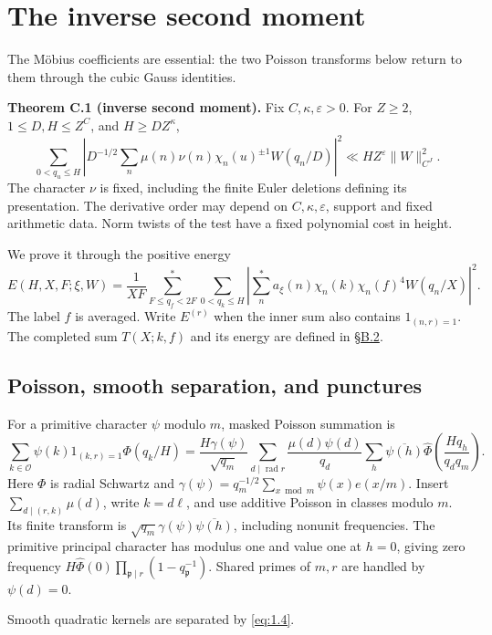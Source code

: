 \documentclass[11pt,a4paper]{article}
\begin{document}
\section{The inverse second moment}\label{sec:C}

The Möbius coefficients are essential: the two Poisson transforms below return to them through the cubic Gauss identities.

\textbf{Theorem C.1 (inverse second moment).} Fix \(C,\kappa,\varepsilon>0\). For \(Z\ge2\), \(1\le D,H\le Z^C\), and \(H\ge DZ^\kappa\), \[
\sum_{0<q_u\le H}\left|D^{-1/2}
\sum_n\mu(n)\nu(n)\chi_n(u)^{\pm1}W(q_n/D)\right|^2
\ll HZ^\varepsilon\|W\|_{C^J}^2.
\tag{C.1}\label{eq:C.1}
\] The character \(\nu\) is fixed, including the finite Euler deletions defining its presentation. The derivative order may depend on \(C,\kappa,\varepsilon\), support and fixed arithmetic data. Norm twists of the test have a fixed polynomial cost in height.

We prove it through the positive energy \[
E(H,X,F;\xi,W)=\frac1{XF}
\sum_{F\le q_f<2F}^{*}\sum_{0<q_k\le H}
\left|\sum_n^{*}a_\xi(n)\chi_n(k)\chi_n(f)^4W(q_n/X)\right|^2.
\tag{C.2}\label{eq:C.2}
\] The label \(f\) is averaged. Write \(E^{(r)}\) when the inner sum also contains \(1_{(n,r)=1}\). The completed sum \(T(X;k,f)\) and its energy are defined in \hyperref[sec:B.2]{§B.2}.

\subsection{Poisson, smooth separation, and punctures}\label{sec:C.1}

For a primitive character \(\psi\) modulo \(m\), masked Poisson summation is \[
\sum_{k\in\mathcal O}\psi(k)1_{(k,r)=1}\Phi(q_k/H)
=\frac{H\gamma(\psi)}{\sqrt{q_m}}
\sum_{d\mid\operatorname{rad}r}\frac{\mu(d)\psi(d)}{q_d}
\sum_h\overline{\psi(h)}\widehat\Phi\!\left(\frac{Hq_h}{q_dq_m}\right).
\tag{C.3}\label{eq:C.3}
\] Here \(\Phi\) is radial Schwartz and \(\gamma(\psi)=q_m^{-1/2}\sum_{x\bmod m}\psi(x)e(x/m)\). Insert \(\sum_{d\mid(r,k)}\mu(d)\), write \(k=d\ell\), and use additive Poisson in classes modulo \(m\). Its finite transform is \(\sqrt{q_m}\gamma(\psi)\overline{\psi(h)}\), including nonunit frequencies. The primitive principal character has modulus one and value one at \(h=0\), giving zero frequency \(H\widehat\Phi(0)\prod_{\mathfrak p\mid r}(1-q_{\mathfrak p}^{-1})\). Shared primes of \(m,r\) are handled by \(\psi(d)=0\).

Smooth quadratic kernels are separated by \eqref{eq:1.4}.
\end{document}

